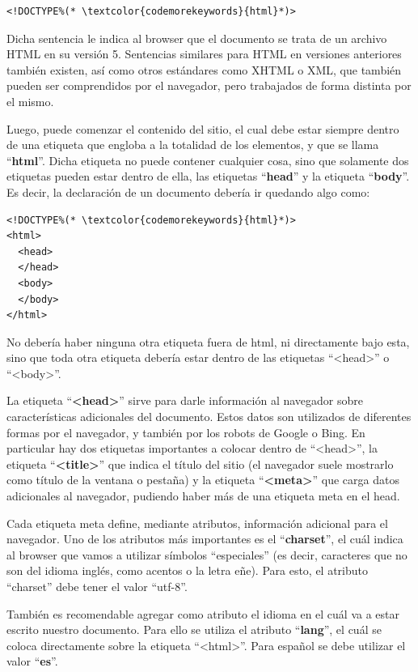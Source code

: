 \begin{lstlisting}[language=XHTML]
<!DOCTYPE%(* \textcolor{codemorekeywords}{html}*)>
\end{lstlisting}

Dicha sentencia le indica al browser que el documento se trata de un archivo
HTML en su versión 5. Sentencias similares para HTML en versiones anteriores
también existen, así como otros estándares como XHTML o XML, que también pueden
ser comprendidos por el navegador, pero trabajados de forma distinta por el mismo.

Luego, puede comenzar el contenido del sitio, el cual debe estar siempre dentro
de una etiqueta que engloba a la totalidad de los elementos, y que se llama
``\textbf{html}''. Dicha etiqueta no puede contener cualquier cosa, sino que
solamente dos etiquetas pueden estar dentro de ella, las etiquetas ``\textbf{head}''
y la etiqueta ``\textbf{body}''. Es decir, la declaración de un documento
debería ir quedando algo como:

\begin{lstlisting}[language=XHTML]
<!DOCTYPE%(* \textcolor{codemorekeywords}{html}*)>
<html>
  <head>
  </head>
  <body>
  </body>
</html>
\end{lstlisting}

No debería haber ninguna otra etiqueta fuera de html, ni directamente bajo
esta, sino que toda otra etiqueta debería estar dentro de las etiquetas ``<head>''
o ``<body>''.

La etiqueta ``\textbf{<head>}'' sirve para darle información al navegador sobre características
adicionales del documento.  Estos datos son utilizados de diferentes formas por
el navegador, y también por los robots de Google o Bing. En particular hay dos
etiquetas importantes a colocar dentro de ``<head>'', la etiqueta ``\textbf{<title>}''
que indica el título del sitio (el navegador suele mostrarlo como título de la
ventana o pestaña) y la etiqueta ``\textbf{<meta>}'' que carga datos adicionales
al navegador, pudiendo haber más de una etiqueta meta en el head.

Cada etiqueta meta define, mediante atributos, información adicional para el
navegador. Uno de los atributos más importantes es el ``\textbf{charset}'', el
cuál indica al browser que vamos a utilizar símbolos ``especiales'' (es decir,
caracteres que no son del idioma inglés, como acentos o la letra eñe). Para esto,
el atributo ``charset'' debe tener el valor ``utf-8''.

También es recomendable agregar como atributo el idioma en el cuál va a estar
escrito nuestro documento. Para ello se utiliza el atributo ``\textbf{lang}'',
el cuál se coloca directamente sobre la etiqueta ``<html>''. Para español se
debe utilizar el valor ``\textbf{es}''.

